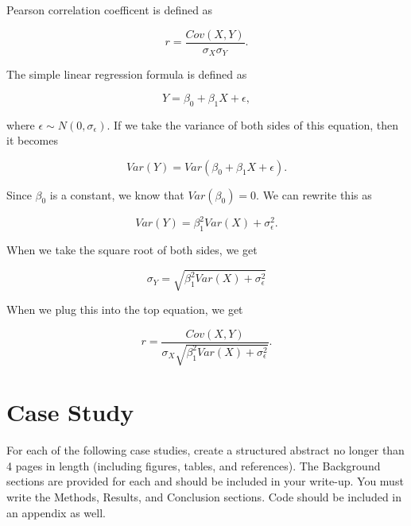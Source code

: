 \documentclass{article}
\begin{document}
\begin{enumerate}
		Pearson correlation coefficent is defined as

		$$r = \frac{Cov(X, Y)}{\sigma_X \sigma_Y}.$$

		The simple linear regression formula is defined as

		$$Y = \beta_0 + \beta_1X + \epsilon,$$

		where $\epsilon \sim N(0, \sigma_\epsilon) $. If we take the variance of both sides of this equation, then it becomes

		$$Var(Y) = Var(\beta_0 + \beta_1X + \epsilon).$$

		Since $\beta_0$ is a constant, we know that $Var(\beta_0) = 0$. We can rewrite this as

		$$Var(Y) = \beta_1^2Var(X) + \sigma_\epsilon^2.$$

		When we take the square root of both sides, we get

		$$\sigma_Y = \sqrt{\beta_1^2Var(X) + \sigma_\epsilon^2} $$

		When we plug this into the top equation, we get

		$$r = \frac{Cov(X, Y)}{\sigma_X \sqrt{\beta_1^2Var(X) + \sigma_\epsilon^2}}.$$


		




	\end{enumerate}



	\newpage
	\section*{Case Study}
	For each of the following case studies, create a structured abstract no longer than 4 pages in length (including figures, tables, and references). The Background sections are provided for each and should be included in your write-up. You must write the Methods, Results, and Conclusion sections. Code should be included in an appendix as well.
\end{document}
